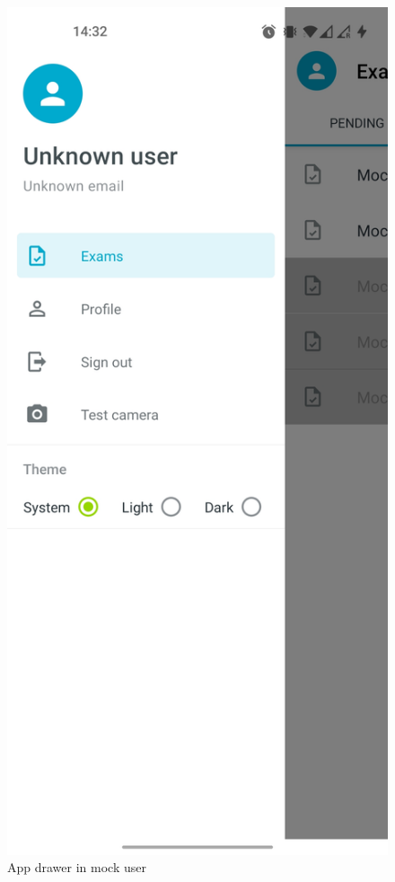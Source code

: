 \begin{minipage}{.5\textwidth}
\begin{figure}[H]
    \centering
    \includegraphics[width=\textwidth]{appendix/imgs/app-drawer.jpg}
    \caption{App drawer in mock user}
    \label{fig:app-drawer}
\end{figure}
\end{minipage}
